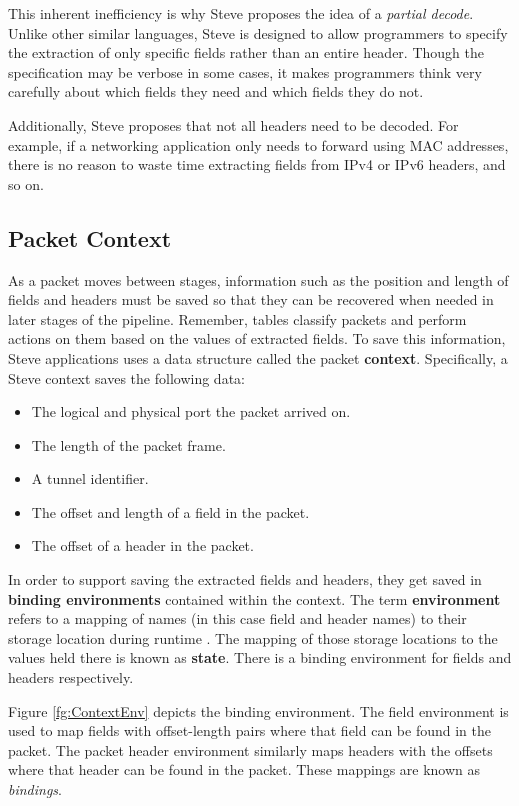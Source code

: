 This inherent inefficiency is why Steve proposes the idea of a \textit{partial decode}. Unlike other similar languages, Steve is designed to allow programmers to specify the extraction of only specific fields rather than an entire header. Though the specification may be verbose in some cases, it makes programmers think very carefully about which fields they need and which fields they do not.

Additionally, Steve proposes that not all headers need to be decoded. For example, if a networking application only needs to forward using MAC addresses, there is no reason to waste time extracting fields from IPv4 or IPv6 headers, and so on.
 
\subsection{Packet Context}

As a packet moves between stages, information such as the position and length of fields and headers must be saved so that they can be recovered when needed in later stages of the pipeline. Remember, tables classify packets and perform actions on them based on the values of extracted fields. To save this information, Steve applications uses a data structure called the packet \textbf{context}. Specifically, a Steve context saves the following data:

\begin{itemize}
\item The logical and physical port the packet arrived on.
\item The length of the packet frame.
\item A tunnel identifier.
\item The offset and length of a field in the packet.
\item The offset of a header in the packet.
\end{itemize}

In order to support saving the extracted fields and headers, they get saved in \textbf{binding environments} contained within the context. The term \textbf{environment} refers to a mapping of names (in this case field and header names) to their storage location during runtime \cite{compilers1}. The mapping of those storage locations to the values held there is known as \textbf{state}. There is a binding environment for fields and headers respectively.

Figure \ref{fg:ContextEnv} depicts the binding environment. The field environment is used to map fields with offset-length pairs where that field can be found in the packet. The packet header environment similarly maps headers with the offsets where that header can be found in the packet. These mappings are known as \textit{bindings}.

